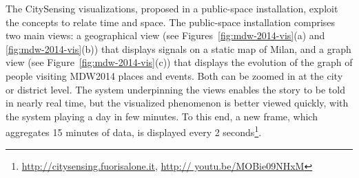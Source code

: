 

The CitySensing visualizations, proposed in a public-space installation, exploit the \frappe{} concepts to relate time and space.
The public-space installation comprises two main views: a geographical view (see Figures~\ref{fig:mdw-2014-vis}(a) and \ref{fig:mdw-2014-vis}(b)) that displays signals on a static map of Milan, and a graph view (see Figure~\ref{fig:mdw-2014-vis}(c)) that displays the evolution of the graph of people visiting MDW2014 places and events. Both can be zoomed in at the city or district level. The system underpinning the views enables the story to be told in nearly real time, but the visualized phenomenon is better viewed quickly, with the system playing a day in few minutes. To this end, a new frame, which aggregates 15 minutes of data, is displayed every 2 seconds\footnote{\url{http://citysensing.fuorisalone.it}, \url{http:// youtu.be/MOBie09NHxM}}.

